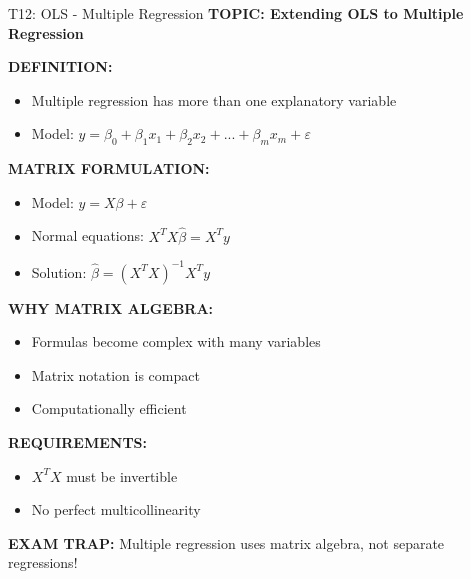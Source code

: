 \documentclass[8pt]{beamer}
\begin{document}
	\begin{frame}{T12: OLS - Multiple Regression}
		\fontsize{6.5}{7.5}\selectfont
		\textbf{TOPIC: Extending OLS to Multiple Regression}
		
		\vspace{0.1cm}
		\textbf{DEFINITION:}
		\begin{itemize}
			\item Multiple regression has more than one explanatory variable
			\item Model: $y = \beta_0 + \beta_1 x_1 + \beta_2 x_2 + ... + \beta_m x_m + \varepsilon$
		\end{itemize}
		
		\vspace{0.1cm}
		\textbf{MATRIX FORMULATION:}
		\begin{itemize}
			\item Model: $y = X\beta + \varepsilon$
			\item Normal equations: $X^TX\hat{\beta} = X^Ty$
			\item Solution: $\hat{\beta} = (X^TX)^{-1}X^Ty$
		\end{itemize}
		
		\vspace{0.1cm}
		\textbf{WHY MATRIX ALGEBRA:}
		\begin{itemize}
			\item Formulas become complex with many variables
			\item Matrix notation is compact
			\item Computationally efficient
		\end{itemize}
		
		\vspace{0.1cm}
		\textbf{REQUIREMENTS:}
		\begin{itemize}
			\item $X^TX$ must be invertible
			\item No perfect multicollinearity
		\end{itemize}
		
		\textcolor{myred}{\textbf{EXAM TRAP:}} Multiple regression uses \textcolor{myblue}{matrix algebra}, not separate regressions!
	\end{frame}
	
\end{document}
